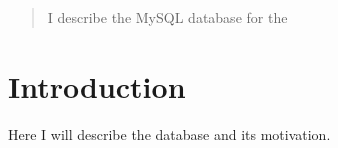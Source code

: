 \documentclass{aastex}
\begin{document}
\title{}

\author{Erin Sheldon}


\begin{abstract}
I describe the MySQL database for the 
\end{abstract}

\keywords{}

\section{Introduction}\label{intro}
Here I will describe the database and its motivation.



\end{document}
